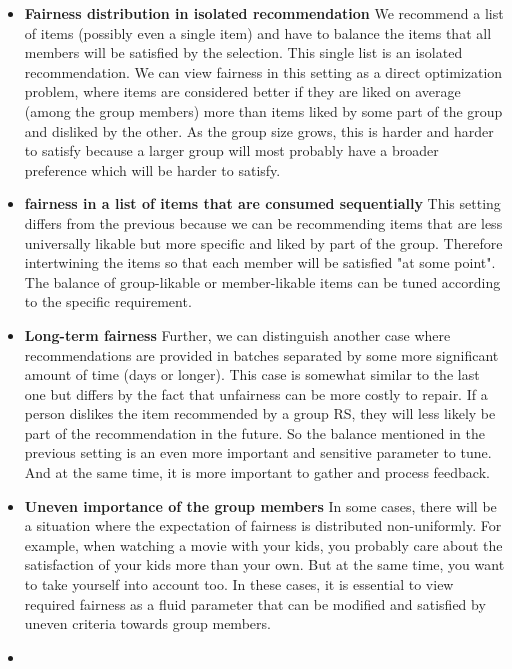 \begin{itemize}
    \item \textbf{Fairness distribution in isolated recommendation}\newline
    We recommend a list of items (possibly even a single item) and have to balance the items that all members will be satisfied by the selection. This single list is an isolated recommendation. We can view fairness in this setting as a direct optimization problem, where items are considered better if they are liked on average (among the group members) more than items liked by some part of the group and disliked by the other. As the group size grows, this is harder and harder to satisfy because a larger group will most probably have a broader preference which will be harder to satisfy.
    
    \item \textbf{fairness in a list of items that are consumed sequentially}
    This setting differs from the previous because we can be recommending items that are less universally likable but more specific and liked by part of the group. Therefore intertwining the items so that each member will be satisfied "at some point". The balance of group-likable or member-likable items can be tuned according to the specific requirement.
    
    \item \textbf{Long-term fairness}\newline
    Further, we can distinguish another case where recommendations are provided in batches separated by some more significant amount of time (days or longer). This case is somewhat similar to the last one but differs by the fact that unfairness can be more costly to repair. If a person dislikes the item recommended by a group RS, they will less likely be part of the recommendation in the future. So the balance mentioned in the previous setting is an even more important and sensitive parameter to tune. And at the same time, it is more important to gather and process feedback.
    
    \item \textbf{Uneven importance of the group members}
    In some cases, there will be a situation where the expectation of fairness is distributed non-uniformly. For example, when watching a movie with your kids, you probably care about the satisfaction of your kids more than your own. But at the same time, you want to take yourself into account too. In these cases, it is essential to view required fairness as a fluid parameter that can be modified and satisfied by uneven criteria towards group members.
    
    \item
    
\end{itemize}

